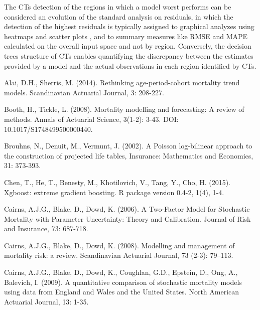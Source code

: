 \documentclass[fleqn,10pt]{wlscirep}
\begin{document}
The CTs detection of the regions in which a model worst performs can be considered an evolution of the standard analysis on residuals, in which the detection of the highest residuals is typically assigned to graphical analyzes using heatmaps and scatter plots \cite{CBD09,Villegas2018}, and to summary measures like RMSE and MAPE calculated on the overall input space and not by region.
Conversely, the decision trees structure of CTs enables quantifying the discrepancy between the estimates provided by a model and the actual observations in each region identified by CTs.

%
\begin{thebibliography}{99}

Alai, D.H., Sherris, M. (2014). Rethinking age-period-cohort mortality trend models. Scandinavian Actuarial Journal, 3: 208-227.

Booth, H., Tickle, L. (2008). Mortality modelling and forecasting: A review of methods. Annals of Actuarial Science, 3(1-2): 3-43. DOI: 10.1017/S1748499500000440.

Brouhns, N., Denuit, M., Vermunt, J. (2002). A Poisson log-bilinear approach to the construction of projected life tables, Insurance: Mathematics and Economics, 31: 373-393.

Chen, T., He, T., Benesty, M., Khotilovich, V., Tang, Y., Cho, H. (2015). Xgboost: extreme gradient boosting. R package version 0.4-2, 1(4), 1-4.

Cairns, A.J.G., Blake, D., Dowd, K. (2006). A Two-Factor Model for Stochastic Mortality with Parameter Uncertainty: Theory and Calibration. Journal of Risk and Insurance, 73: 687-718.

Cairns, A.J.G., Blake, D., Dowd, K. (2008). Modelling and management of mortality risk: a review. Scandinavian Actuarial Journal, 73 (2-3): 79–113.

Cairns, A.J.G., Blake, D., Dowd, K., Coughlan, G.D., Epstein, D., Ong, A., Balevich, I. (2009). A quantitative comparison of stochastic mortality models using data from England and Wales and the United States. North American Actuarial Journal, 13: 1-35.


\end{thebibliography}
\end{document}
